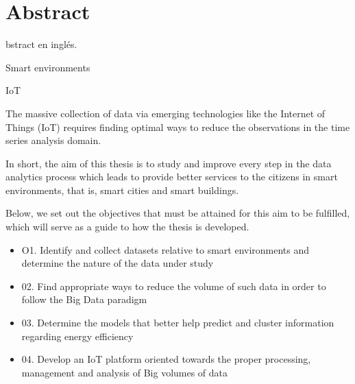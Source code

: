 %
%
\let\textcircled=\pgftextcircled
{}
\chapter{Abstract}
\label{chap:abs}

bstract en inglés. 


Smart environments

IoT



The massive collection of data via emerging technologies like the Internet of Things (IoT) requires finding optimal ways to
reduce the observations in the time series analysis domain.







In short, the aim of this thesis is to study and improve every step in the data analytics process which leads to provide better services to the citizens in smart environments, that is, smart cities and smart buildings.

Below, we set out the objectives that must be attained for this aim to be fulfilled, which will serve as a guide to how the thesis is developed.

\begin{itemize}

\item O1. Identify and collect datasets relative to smart environments and determine the nature of the data under study
\item 02. Find appropriate ways to reduce the volume of such data in order to follow the Big Data paradigm
\item 03. Determine the models that better help predict and cluster information regarding energy efficiency
\item 04. Develop an IoT platform oriented towards the proper processing, management and analysis of Big volumes of data 

\end{itemize}